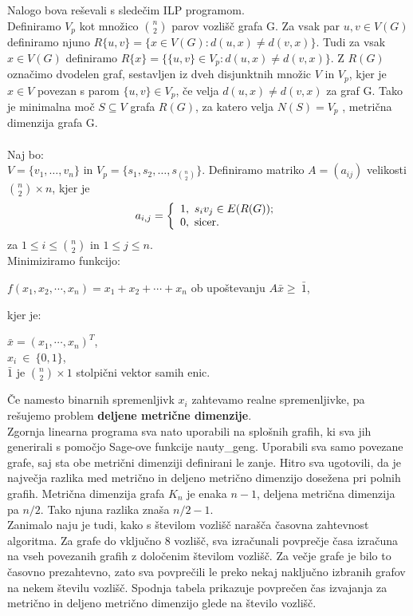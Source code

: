 \documentclass[a4paper]{report}
\begin{document}
Nalogo bova reševali s sledečim ILP programom.\\

Definiramo $V_p$ kot množico $\binom{n}{2}$ parov vozlišč grafa G. Za vsak par $u,v \in V(G)$ definiramo njuno $R\{u,v\}=\{x \in V(G): d(u,x)\neq d(v,x)\}.$ Tudi za vsak $x \in V(G)$ definiramo $R\{x\}= \{\{u,v\}\in V_p: d(u,x)\neq d(v,x)\}$. Z $R(G)$ označimo dvodelen graf, sestavljen iz dveh disjunktnih množic $V$ in $V_p$, kjer je $x \in V$ povezan s parom $\{u,v\} \in V_p$, če velja $d(u,x)\neq d(v,x)$ za graf G.  Tako je minimalna moč $S \subseteq V$ grafa $R(G)$, za katero velja $N(S) = V_p$  , metrična dimenzija grafa G. \\\\
Naj bo:\\
$V = \{v_1,\dots, v_n\}$ in $V_p = \{s_1,s_2,\dots,s_{\binom{n}{2}} \} $. Definiramo matriko  $ A = (a_{ij})$  velikosti $\binom{n}{2} \times n$, kjer je\[ a_{i,j}  =  \left \{ \begin{array}{l}1,\ \mbox{$ s_i v_j \in E(R(G))$}; \\0,\ \mbox{sicer}. \end{array} \right. \]
za $1\le i\le \binom{n}{2}$ in $1\le  j\le n$.\\

 Minimiziramo funkcijo: \begin{center}$f(x_1,x_2, \cdots,x_n)=x_1+x_2+\cdots+x_n$ 
ob upoštevanju $A\bar{x}\ge\ \bar{1}$,\end{center} 
kjer je: \begin{center}
 $\bar{x}=(x_1,\cdots,x_n)^T$,\\
$x_i\ \in\ \{0,1 \}$,\\
$\bar{1}$ je $\binom{n}{2}\times 1$  stolpični vektor samih enic. \end{center}
Če namesto binarnih spremenljivk $x_i$ zahtevamo realne spremenljivke, pa rešujemo problem \textbf{deljene metrične dimenzije}. \\

Zgornja linearna programa sva nato uporabili na splošnih grafih, ki sva jih generirali s pomočjo Sage-ove funkcije nauty\_geng. Uporabili sva samo povezane grafe, saj sta obe metrični dimenziji definirani le zanje. Hitro sva ugotovili, da je največja razlika med metrično in deljeno metrično dimenzijo dosežena pri polnih grafih. Metrična dimenzija grafa $K_n$ je enaka $n-1$, deljena metrična dimenzija pa $n/2$. Tako njuna razlika znaša $n/2-1$. \\

Zanimalo naju je tudi, kako s številom vozlišč narašča časovna zahtevnost algoritma. Za grafe do vključno 8 vozlišč, sva izračunali povprečje časa izračuna na vseh povezanih grafih z določenim številom vozlišč. Za večje grafe je bilo to časovno prezahtevno, zato sva povprečili le preko nekaj naključno izbranih grafov na nekem številu vozlišč. Spodnja tabela prikazuje povprečen čas izvajanja za metrično in deljeno metrično dimenzijo glede na število vozlišč.
\end{document}
